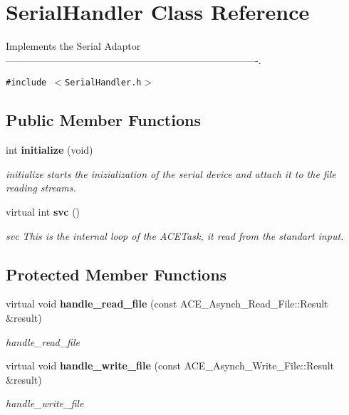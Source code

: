 \section{Serial\-Handler Class Reference}
\label{classSerialHandler}
Implements the Serial Adaptor ----------------------------------------------------------------------------.  


{\tt \#include $<$Serial\-Handler.h$>$}

\subsection*{Public Member Functions}
\begin{CompactItemize}
\item 
int {\bf initialize} (void)
\begin{CompactList}\small\item\em initialize starts the inizialization of the serial device and attach it to the file reading streams. \item\end{CompactList}\item 
virtual int {\bf svc} ()
\begin{CompactList}\small\item\em svc This is the internal loop of the ACETask, it read from the standart input. \item\end{CompactList}\end{CompactItemize}
\subsection*{Protected Member Functions}
\begin{CompactItemize}
\item 
virtual void {\bf handle\_\-read\_\-file} (const ACE\_\-Asynch\_\-Read\_\-File::Result \&result)
\begin{CompactList}\small\item\em handle\_\-read\_\-file \item\end{CompactList}\item 
virtual void {\bf handle\_\-write\_\-file} (const ACE\_\-Asynch\_\-Write\_\-File::Result \&result)
\begin{CompactList}\small\item\em handle\_\-write\_\-file \item\end{CompactList}\end{CompactItemize}


